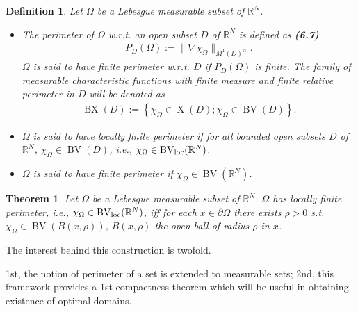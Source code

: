 \documentclass{book}
\numberwithin{equation}{section}
\newtheorem{definition}{Definition}[section]
\newtheorem{theorem}{Theorem}[section]
\begin{document}
\begin{enumerate}
    \begin{definition}
        Let $\Omega$ be a Lebesgue measurable subset of $\mathbb{R}^N$.
        \begin{itemize}
            \item[(i)] The \emph{perimeter of $\Omega$ w.r.t. an open subset $D$ of $\mathbb{R}^N$} is defined as \textbf{(6.7)}
            \begin{align*}
                P_D(\Omega) := \|\nabla\chi_\Omega\|_{M^1(D)^N}.
            \end{align*}
            $\Omega$ is said to have \emph{finite perimeter w.r.t. $D$} if $P_D(\Omega)$ is finite. The family of measurable characteristic functions with finite measure and finite relative perimeter in $D$ will be denoted as
            \begin{align*}
                \operatorname{BX}(D) := \left\{\chi_\Omega\in\operatorname{X}(D);\chi_\Omega\in\operatorname{BV}(D)\right\}.
            \end{align*}
            \item[(ii)] $\Omega$ is said to have \emph{locally finite perimeter} if for all bounded open subsets $D$ of $\mathbb{R}^N$, $\chi_\Omega\in\operatorname{BV}(D)$, i.e., $\chi_\Omega\in\operatorname{BV}_{\rm loc}(\mathbb{R}^N)$.
            \item[(iii)] $\Omega$ is said to have \emph{finite perimeter} if $\chi_\Omega\in\operatorname{BV}(\mathbb{R}^N)$.
        \end{itemize}
    \end{definition}
    
    \begin{theorem}
        Let $\Omega$ be a Lebesgue measurable subset of $\mathbb{R}^N$. $\Omega$ has \emph{locally finite perimeter}, i.e., $\chi_\Omega\in\operatorname{BV}_{\rm loc}(\mathbb{R}^N)$, iff for each $x\in\partial\Omega$ there exists $\rho > 0$ s.t. $\chi_\Omega\in\operatorname{BV}(B(x,\rho))$, $B(x,\rho)$ the open ball of radius $\rho$ in $x$. 
    \end{theorem}
    The interest behind this construction is twofold.
    
    1st, the notion of perimeter of a set is extended to measurable sets; 2nd, this framework provides a 1st compactness theorem which will be useful in obtaining existence of optimal domains.
    

\end{enumerate}
\end{document}
